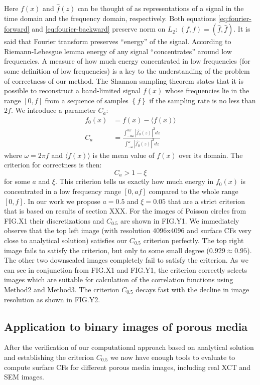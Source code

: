 \documentclass[reprint,amsmath,amssymb,aps,pre]{revtex4-1}
\begin{document}
Here $f(x)$ and $\hat{f}(z)$ can be thought of as representations of a signal in
the time domain and the frequency domain, respectively. Both equations
\cref{eq:fourier-forward} and \cref{eq:fourier-backward} preserve norm on $L_2$:
$(f, f) = (\hat{f}, \hat{f})$. It is said that Fourier transform preserves
``energy'' of the signal. According to Riemann-Lebesgue lemma \cite{bookHilb}
energy of any signal ``concentrates'' around low frequencies. A measure of how
much energy concentrated in low frequencies (for some definition of low
frequencies) is a key to the understanding of the problem of correctness of our
method. The Shannon sampling theorem \cite{bookHilb} states that it is possible
to reconstruct a band-limited signal $f(x)$ whose frequencies lie in the range
$[0, f]$ from a sequence of samples $\left\{f\right\}$ if the sampling rate is
no less than $2f$. We introduce a parameter $C_a$:
\begin{align*}
  f_0(x) &= f(x) - \langle f(x) \rangle \\
  C_a &= \frac{\int_{-a\omega}^{a\omega} |\hat{f_0}(z)|^2 dz}{\int_{-\omega}^{\omega} |\hat{f_0}(z)|^2 dz}
\end{align*}
where $\omega = 2\pi f$ and $\langle f(x) \rangle$ is the mean value of $f(x)$
over its domain. The criterion for correctness is then:
\begin{equation*}
  C_a > 1 - \xi
\end{equation*}
for some $a$ and $\xi$. This criterion tells us exactly how much energy in
$f_0(x)$ is concentrated in a low frequency range $[0, af]$ compared to the
whole range $[0, f]$. In our work we propose $a = 0.5$ and $\xi = 0.05$ that are
a strict criterion that is based on results of section XXX. For the images of
Poisson circles from FIG.X1 their discretizations and $C_{0.5}$ are shown in
FIG.Y1. We immediately observe that the top left image (with resolution
4096x4096 and surface CFs very close to analytical solution) satisfies our
$C_{0.5}$ criterion perfectly. The top right image fails to satisfy the
criterion, but only to some small degree ($0.929 \approx 0.95$). The other two
downscaled images completely fail to satisfy the criterion. As we can see in
conjunction from FIG.X1 and FIG.Y1, the criterion correctly selects images which
are suitable for calculation of the correlation functions using Method2 and
Method3. The criterion $C_{0.5}$ decays fast with the decline in image
resolution as shown in FIG.Y2.

\subsection{Application to binary images of porous media}
After the verification of our computational approach based on analytical
solution and establishing the criterion $C_{0.5}$ we now have enough tools to
evaluate to compute surface CFs for different porous media images, including
real XCT and SEM images.
\end{document}
